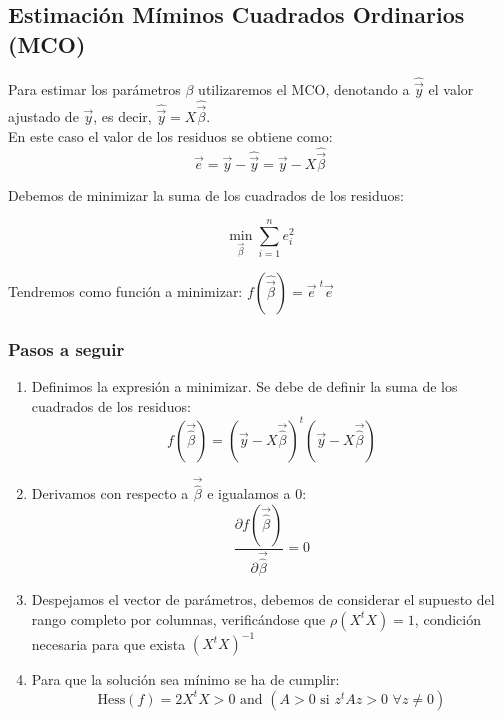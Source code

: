 \documentclass[a4paper,12pt]{article}
\begin{document}
\subsection{Estimación Míminos Cuadrados Ordinarios (MCO)}

Para estimar los parámetros $\beta$ utilizaremos el MCO, denotando a $\hat{\vec{y}}$ el valor ajustado de $\vec{y}$, es decir, $\hat{\vec{y}} = X\hat{\vec{\beta}}$. \\

En este caso el valor de los residuos se obtiene como:
\begin{equation}
    \vec{e}=\vec{y}-\hat{\vec{y}} = \vec{y}-X\hat{\vec{\beta}}
\end{equation}

Debemos de minimizar la suma de los cuadrados de los residuos:

\begin{equation}
    \min_{\vec{\beta}} \sum_{i=1}^{n} e_i^2
\end{equation}

Tendremos como función a minimizar: $f(\hat{\vec{\beta}})=\vec{e}^{\,\,t}  \vec{e}$

\subsubsection{Pasos a seguir}
\begin{enumerate}
    \item Definimos la expresión a minimizar. Se debe de definir la suma de los cuadrados de los residuos:
    \begin{equation}
        f(\vec{\hat{\beta}}) = (\vec{y} - X\vec{\hat{\beta}})^{t}(\vec{y} - X\vec{\hat{\beta}})
    \end{equation}
    \item Derivamos con respecto a $\vec{\hat{\beta}}$ e igualamos a 0:
    \begin{equation}
        \frac{\partial f(\vec{\hat{\beta}})}{\partial \vec{\hat{\beta}}} = 0
    \end{equation}
    \item Despejamos el vector de parámetros, debemos de considerar el supuesto del rango completo por columnas, verificándose que $\rho (X^tX) = 1$, condición necesaria para que exista $(X^tX)^{-1}$
    \item Para que la solución sea mínimo se ha de cumplir:
    \begin{equation}
        \text{Hess}(f) = 2X^tX > 0 \text{ and } 
        (A>0 \text{ si } z^tAz > 0 \,\,\forall z \neq 0)
    \end{equation}
\end{enumerate}
\end{document}
